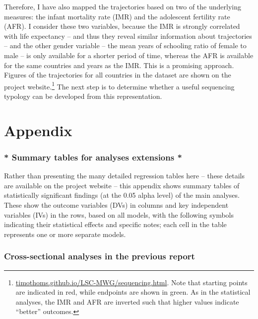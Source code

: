 \documentclass[12pt]{article}
\begin{document}
Therefore, I have also mapped the trajectories based on two of the underlying measures: the infant mortality rate (IMR) and the adolescent fertility rate (AFR). I consider these two variables, because the IMR is strongly correlated with life expectancy -- and thus they reveal similar information about trajectories -- and the other gender variable -- the mean years of schooling ratio of female to male -- is only available for a shorter period of time, whereas the AFR is available for the same countries and years as the IMR. This is a promising approach.
Figures of the trajectories for all countries in the dataset are shown on the project website.\footnote{\href{https://timothoms.github.io/LSC-MWG/sequencing.html}{timothoms.github.io/LSC-MWG/sequencing.html}. Note that starting points are indicated in red, while endpoints are shown in green. As in the statistical analyses, the IMR and AFR are inverted such that higher values indicate \enquote{better} outcomes.}
The next step is to determine whether a useful sequencing typology can be developed from this representation.

\clearpage
\appendix
\part*{Appendix}
\label{appendix}

\section{* Summary tables for analyses extensions *}
\label{appendix_tables}

Rather than presenting the many detailed regression tables here -- these details are available on the project website -- this appendix shows summary tables of statistically significant findings (at the 0.05 alpha level) of the main analyses. These show the outcome variables (DVs) in columns and key independent variables (IVs) in the rows, based on all models, with the following symbols indicating their statistical effects and specific notes; each cell in the table represents one or more separate models.








\section{Cross-sectional analyses in the previous report}
\label{appendix_cs_dane}
\end{document}
